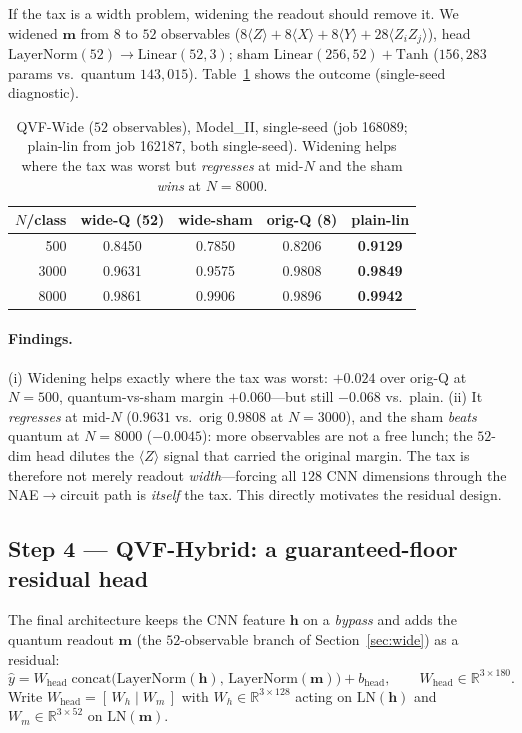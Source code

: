 \documentclass[10pt,letterpaper]{article}
\theoremstyle{plain}
\theoremstyle{definition}
\newcommand{\win}[1]{\textcolor{good}{\textbf{#1}}}
\newcommand{\lose}[1]{\textcolor{bad}{#1}}
\begin{document}
If the tax is a width problem, widening the readout should remove it. We widened
$\mathbf{m}$ from $8$ to $52$ observables
($8\langle Z\rangle + 8\langle X\rangle + 8\langle Y\rangle + 28\langle Z_iZ_j\rangle$),
head $\mathrm{LayerNorm}(52)\to\mathrm{Linear}(52,3)$; sham
$\mathrm{Linear}(256,52)+\mathrm{Tanh}$ ($156{,}283$ params vs.\ quantum
$143{,}015$). Table~\ref{tab:wide} shows the outcome (single-seed diagnostic).

\begin{table}[h!]
\centering
\caption{QVF-Wide ($52$ observables), Model\_II, single-seed (job 168089;
plain-lin from job 162187, both single-seed). Widening helps where the tax was
worst but \emph{regresses} at mid-$N$ and the sham \emph{wins} at $N{=}8000$.}
\label{tab:wide}
\begin{tabular}{@{}rcccc@{}}
\toprule
$N$/class & wide-Q (52) & wide-sham & orig-Q (8) & plain-lin \\
\midrule
500  & 0.8450 & 0.7850 & 0.8206 & \win{0.9129} \\
3000 & \lose{0.9631} & 0.9575 & 0.9808 & \win{0.9849} \\
8000 & 0.9861 & \lose{0.9906} & 0.9896 & \win{0.9942} \\
\bottomrule
\end{tabular}
\end{table}

\paragraph{Findings.}
(i) Widening helps exactly where the tax was worst: $+0.024$ over orig-Q at
$N{=}500$, quantum-vs-sham margin $+0.060$---but still $-0.068$ vs.\ plain.
(ii) It \emph{regresses} at mid-$N$ ($0.9631$ vs.\ orig $0.9808$ at $N{=}3000$),
and the sham \emph{beats} quantum at $N{=}8000$ ($-0.0045$): more observables are
not a free lunch; the $52$-dim head dilutes the $\langle Z\rangle$ signal that
carried the original margin.
The tax is therefore not merely readout \emph{width}---forcing all $128$ CNN
dimensions through the NAE$\to$circuit path is \emph{itself} the tax. This
directly motivates the residual design.

\subsection{Step 4 --- QVF-Hybrid: a guaranteed-floor residual head}
\label{sec:hybrid}

The final architecture keeps the CNN feature $\mathbf{h}$ on a \emph{bypass} and
adds the quantum readout $\mathbf{m}$ (the $52$-observable branch of
Section~\ref{sec:wide}) as a residual:
\begin{equation}
  \hat{y} = W_\mathrm{head}\;
  \mathrm{concat}\!\big(\mathrm{LayerNorm}(\mathbf{h}),\,\mathrm{LayerNorm}(\mathbf{m})\big) + b_\mathrm{head},
  \qquad W_\mathrm{head}\in\mathbb{R}^{3\times 180}.
  \label{eq:hybrid-head}
\end{equation}
Write $W_\mathrm{head} = [\,W_h \mid W_m\,]$ with $W_h\in\mathbb{R}^{3\times128}$
acting on $\mathrm{LN}(\mathbf{h})$ and $W_m\in\mathbb{R}^{3\times52}$ on
$\mathrm{LN}(\mathbf{m})$.
\end{document}
